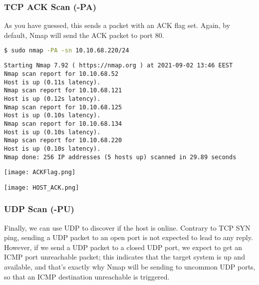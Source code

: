 \documentclass[11pt]{article}
\newenvironment{commandbox}[1][]{
    \begin{tcolorbox}[
        colback=kalibackground,
        colframe=commandcolor,
        fonttitle=\bfseries\color{white},
        title=#1,
        breakable=true
    ]
}{
    \end{tcolorbox}
}
\begin{document}
\subsubsection{TCP ACK Scan (-PA)}

As you have guessed, this sends a packet with an ACK flag set. Again, by default, Nmap will send the ACK packet to port 80.

\begin{commandbox}[TCP ACK Scan (-PA)]
\begin{lstlisting}[language=bash, style=bash, basicstyle=\small\ttfamily\color{warningcolor}]
$ sudo nmap -PA -sn 10.10.68.220/24
\end{lstlisting}
\begin{lstlisting}[basicstyle=\small\ttfamily\color{kalitext}]
Starting Nmap 7.92 ( https://nmap.org ) at 2021-09-02 13:46 EEST
Nmap scan report for 10.10.68.52
Host is up (0.11s latency).
Nmap scan report for 10.10.68.121
Host is up (0.12s latency).
Nmap scan report for 10.10.68.125
Host is up (0.10s latency).
Nmap scan report for 10.10.68.134
Host is up (0.10s latency).
Nmap scan report for 10.10.68.220
Host is up (0.10s latency).
Nmap done: 256 IP addresses (5 hosts up) scanned in 29.89 seconds
\end{lstlisting}
\end{commandbox}
\begin{center}
    \texttt{[image: ACKFlag.png]}
    \end{center}
    \begin{center}
        \texttt{[image: HOST\_ACK.png]}
        \end{center}
\subsubsection{UDP Scan (-PU)}

Finally, we can use UDP to discover if the host is online. Contrary to TCP SYN ping, sending a UDP packet to an open port is not expected to lead to any reply. However, if we send a UDP packet to a closed UDP port, we expect to get an ICMP port unreachable packet; this indicates that the target system is up and available, and that's exactly why Nmap will be sending to uncommon UDP ports, so that an ICMP destination unreachable is triggered.
\end{document}
